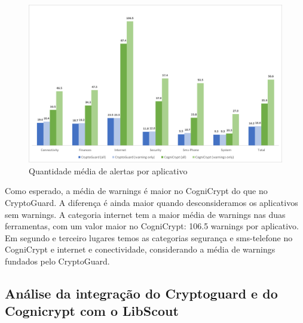 \begin{figure}[!h]
    \centering
    \includegraphics[scale=0.3]{img/averageWarnings.png}
    \caption{Quantidade média de alertas por aplicativo}
    \label{averageWarnings}
\end{figure}

Como esperado, a média de warnings é maior no CogniCrypt do que no CryptoGuard. A diferença é ainda maior quando desconsideramos os aplicativos sem warnings. A categoria internet tem a maior média de warnings nas duas ferramentas, com um valor maior no CogniCrypt: 106.5 warnings por aplicativo. Em segundo e terceiro lugares temos as categorias segurança e sms-telefone no CogniCrypt e internet e conectividade, considerando a média de warnings fundados pelo CryptoGuard. \cite{perception_developers}

\subsection{Análise da integração do Cryptoguard e do Cognicrypt com o LibScout}







